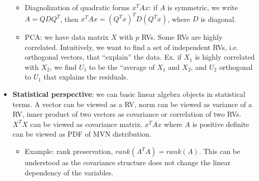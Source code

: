 \documentclass{report}
\begin{document}
\begin{itemize}
\begin{itemize}
	\item Diagnolization of quadratic forms $x^T A x$: if $A$ is symmetric, we write $A = Q D Q^T$, then $x^T A x = (Q^Tx)^T D (Q^Tx)$, where $D$ is diagonal.  
	
	\item PCA: we have data matrix $X$ with $p$ RVs. Some RVs are highly correlated. Intuitively, we want to find a set of independent RVs, i.e. orthogonal vectors, that ``explain'' the data. Ex. if $X_1$ is highly correlated with $X_2$, we find $U_1$ to be the ``average of $X_1$ and $X_2$, and $U_2$ orthogonal to $U_1$ that explains the residuals. 
\end{itemize}

\item \textbf{Statistical perspective}: we can basic linear algebra objects in statistical terms. A vector can be viewed as a RV, norm can be viewed as variance of a RV, inner product of two vectors as covariance or correlation of two RVs. $X^T X$ can be viewed as covariance matrix. $x^T A x$ where $A$ is positive definite can be viewed as PDF of MVN distribution. 
\begin{itemize}
	\item Example: rank preservation, $rank(A^T A) = rank(A)$. This can be understood as the covariance structure does not change the linear dependency of the variables. 
\end{itemize}
\end{itemize}
\end{document}
